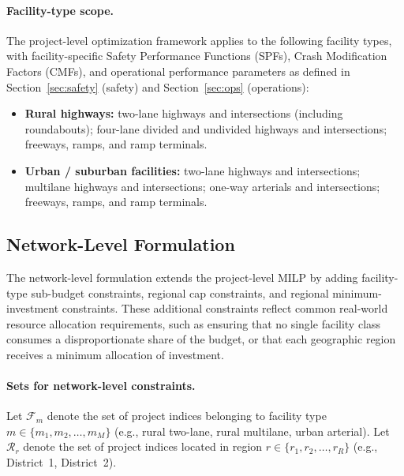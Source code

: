 \paragraph{Facility-type scope.} The project-level optimization framework
applies to the following facility types, with facility-specific Safety
Performance Functions (SPFs), Crash Modification Factors (CMFs), and
operational performance parameters as defined in
Section~\ref{sec:safety} (safety) and Section~\ref{sec:ops} (operations):

\begin{itemize}[leftmargin=2em, itemsep=2pt]
  \item \textbf{Rural highways:} two-lane highways and intersections
    (including roundabouts); four-lane divided and undivided highways
    and intersections; freeways, ramps, and ramp terminals.
  \item \textbf{Urban / suburban facilities:} two-lane highways and
    intersections; multilane highways and intersections; one-way
    arterials and intersections; freeways, ramps, and ramp terminals.
\end{itemize}

\subsection{Network-Level Formulation}
\label{sec:milp-network}

The network-level formulation extends the project-level MILP by adding
facility-type sub-budget constraints, regional cap constraints, and regional
minimum-investment constraints. These additional constraints reflect common
real-world resource allocation requirements, such as ensuring that no single
facility class consumes a disproportionate share of the budget, or that each
geographic region receives a minimum allocation of investment.

\paragraph{Sets for network-level constraints.}
Let $\mathcal{F}_m$ denote the set of project indices belonging to facility
type $m \in \{m_1, m_2, \ldots, m_M\}$ (e.g., rural two-lane, rural multilane,
urban arterial). Let $\mathcal{R}_r$ denote the set of project indices located
in region $r \in \{r_1, r_2, \ldots, r_R\}$ (e.g., District~1, District~2).

